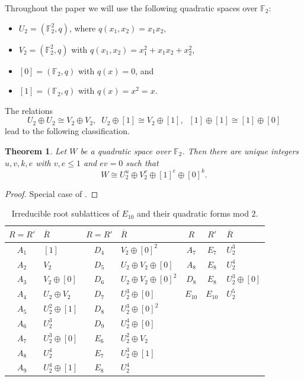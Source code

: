 \documentclass[a4paper]{amsart}
\theoremstyle{definition}
\theoremstyle{plain}
\newtheorem{theorem}[definition]{Theorem}
\newcommand{\FF}{\mathbb{F}}
\begin{document}
Throughout the paper we will use the following quadratic spaces over $\FF_2$:
\begin{itemize}
    \item $U_2=(\FF_2^2,q)$, where $q(x_1,x_2)=x_1x_2$,
    \item $V_2=(\FF_2^2,q)$ with $q(x_1,x_2)=x_1^2+x_1x_2+x_2^2$,
    \item $[0]=(\FF_2,q)$ with $q(x)=0$, and
    \item $[1]=(\FF_2,q)$ with $q(x)=x^2=x$. 
\end{itemize}
The relations 
\[U_2\oplus U_2 \cong V_2 \oplus V_2,\;\; U_2 \oplus [1]\cong V_2 \oplus [1],\;\; [1]\oplus [1] \cong [1] \oplus [0]\] 
lead to the following classification. 
\begin{theorem}
Let $W$ be a quadratic space over $\FF_2$. Then there are unique integers $u,v,k,e$ with $v,e\leq 1$ and $ev=0$ such that 
\[W \cong U_2^u \oplus V_2^v \oplus [1]^e \oplus [0]^k.\]
\end{theorem}
\begin{proof}
    Special case of \cite[Satz 2.15]{kneser}.
\end{proof}
\begin{table}
\begin{tabular}{cl|cl|ccl}
$R=R'$ & $\overline{R}$  & $R=R'$& $\overline{R}$  & $R$   &$R'$ & $\overline{R}$ \\
\hline
$A_1$&  $[1]$            & $D_4$ & $V_2\oplus [0]^2$ & $A_7$ & $E_7$ & $U_2^3$\\
$A_2$&  $V_2$            & $D_5$ & $U_2\oplus V_2 \oplus [0]$ & $A_8$ & $E_8$ & $U_2^4$\\
$A_3$&  $V_2 \oplus [0]$ & $D_6$ & $U_2\oplus V_2 \oplus [0]^2$ & $D_8$ & $E_8$ & $U_2^3 \oplus [0]$\\
$A_4$&  $U_2\oplus V_2$  & $D_7$ & $U_2^3 \oplus [0]$ & $E_{10}$ & $E_{10}$ & $U_2^5$ \\
$A_5$&  $U_2^2\oplus[1]$ & $D_8$ & $U_2^3 \oplus [0]^2$ & &  & \\
$A_6$&  $U_2^3$          & $D_9$ & $U_2^4\oplus [0]$ & &  & \\
$A_7$&  $U_2^3\oplus [0]$& $E_6$ & $U_2^2\oplus V_2$ &  & \\
$A_8$&  $U_2^4$          & $E_7$ & $U_2^3 \oplus [1]$&  & \\
$A_9$&  $U_2^4\oplus [1]$  & $E_8$ & $U_2^4$ &  & 
\end{tabular}
\caption{Irreducible root sublattices of $E_{10}$ and their quadratic forms mod $2$.}\label{table:root_mod2}
\end{table}
\end{document}
